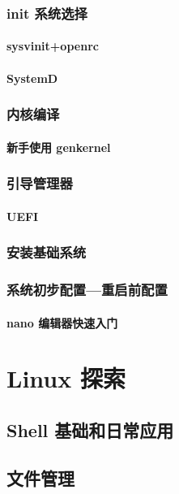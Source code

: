 \documentclass[amstex,twoside]{ctexbook}
\begin{document}
\subsection{init 系统选择}

\subsubsection{sysvinit+openrc}
\subsubsection{SystemD}

\subsection{内核编译}

\subsubsection{新手使用 genkernel}

\subsection{引导管理器}
\subsubsection{UEFI}

\subsection{安装基础系统}
\subsection{系统初步配置—重启前配置}

\subsubsection{nano 编辑器快速入门}

\chapter{Linux 探索}
\section{Shell 基础和日常应用}

\section{文件管理}	
\end{document}
